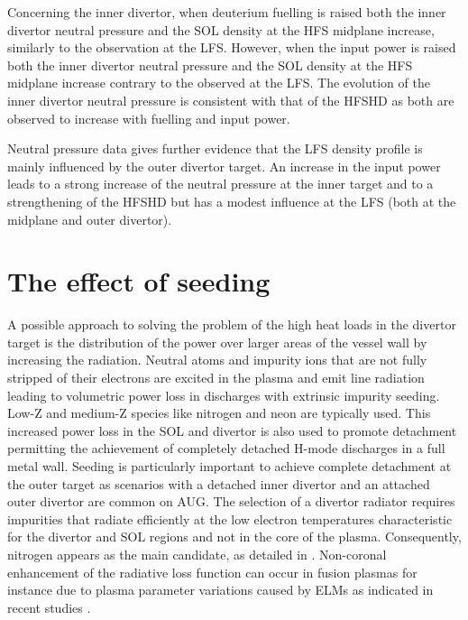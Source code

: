 \documentclass[12pt]{iopart}
\begin{document}
Concerning the inner divertor, when deuterium fuelling is raised both the inner divertor neutral pressure and the  SOL density at the HFS midplane increase, similarly to the observation at the LFS. However, when the input power is raised both the inner divertor neutral pressure and the SOL density at the HFS midplane increase contrary to the observed at the LFS. The evolution of the inner divertor neutral pressure is consistent with that of the HFSHD as both are observed to increase with fuelling and input power.

Neutral pressure data gives further evidence that the LFS density profile is mainly influenced by the outer divertor target. An increase in the input power leads to a strong increase of the neutral pressure at the inner target and to a strengthening of the HFSHD but has a modest influence at the LFS (both at the midplane and outer divertor).    

\section{The effect of seeding}
\label{section:effectofseedinghmode}

A possible approach to solving the problem of the high heat loads in the divertor target is the distribution of the power over larger areas of the vessel wall by increasing the radiation. Neutral atoms and impurity ions that are not fully stripped of their electrons are excited in the plasma and emit line radiation leading to volumetric power loss in discharges with extrinsic impurity seeding. Low-Z and medium-Z species like nitrogen and neon are typically used. This increased power loss in the SOL and divertor is also used to promote detachment permitting the achievement of completely detached H-mode discharges in a full metal wall. Seeding is particularly important to achieve complete detachment at the outer target as scenarios with a detached inner divertor and an attached outer divertor are common on AUG. The selection of a divertor radiator requires impurities that radiate efficiently at the low electron temperatures characteristic for the divertor and SOL regions and not in the core of the plasma. Consequently, nitrogen appears as the main candidate, as detailed in \cite{kallenbach2013impurity}. Non-coronal enhancement of the radiative loss function can occur in fusion plasmas for instance due to plasma parameter variations caused by ELMs as indicated in recent studies \cite{Kallenbach2015}. 
\end{document}
